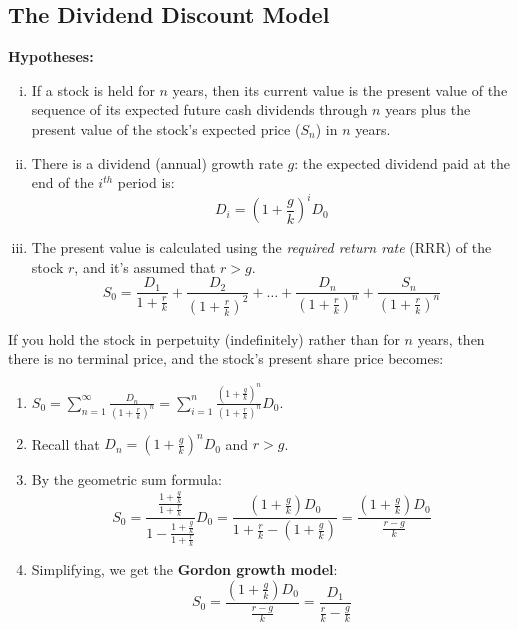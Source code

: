 \subsection{The Dividend Discount Model}
\textbf{Hypotheses: }
\begin{enumerate}[i.]
    \item If a stock is held for \(n\) years, then its current value is the present value of the sequence of its expected future cash dividends through \(n\) years plus the present value of the stock's expected price (\(S_n\)) in \(n\) years.

    \item There is a dividend (annual) growth rate \(g\): the expected dividend paid at the end of the \(i^{th}\) period is:
    \begin{equation*}
        D_i = (1+\frac{g}{k})^iD_0
    \end{equation*}

    \item The present value is calculated using the \textit{required return rate} (RRR) of the stock \(r\), and it's assumed that \(r>g\).
    \begin{equation*}
        S_0 = \frac{D_1}{1+\frac{r}{k}} + \frac{D_2}{(1+\frac{r}{k})^2} + \dots + \frac{D_n}{(1+\frac{r}{k})^n} + \frac{S_n}{(1+\frac{r}{k})^n}
    \end{equation*}
\end{enumerate}
If you hold the stock in perpetuity (indefinitely) rather than for \(n\) years, then there is no terminal price, and the stock's present share price becomes:
\begin{enumerate}
    \item \(S_0 = \sum_{n=1}^\infty \frac{D_n}{(1+\frac{r}{k})^n} = \sum_{i=1}^n \frac{(1+\frac{g}{k})^n}{(1+\frac{r}{k})^n}D_0\).

    \item Recall that \(D_n = (1+\frac{g}{k})^nD_0\) and \(r > g\).

    \item By the geometric sum formula:
    \begin{equation*}
        S_0 = \frac{\frac{1+\frac{g}{k}}{1+\frac{r}{k}}}{1 - \frac{1+\frac{g}{k}}{1+\frac{r}{k}}}D_0 =\frac{(1+\frac{g}{k})D_0}{1+\frac{r}{k}-(1+\frac{g}{k})} = \frac{(1+\frac{g}{k})D_0}{\frac{r-g}{k}}
    \end{equation*}

    \item Simplifying, we get the \textbf{Gordon growth model}:
    \begin{equation*}
        \boxed{S_0 = \frac{(1+\frac{g}{k})D_0}{\frac{r-g}{k}}=\frac{D_1}{\frac{r}{k} - \frac{g}{k}}}
    \end{equation*}
\end{enumerate}

